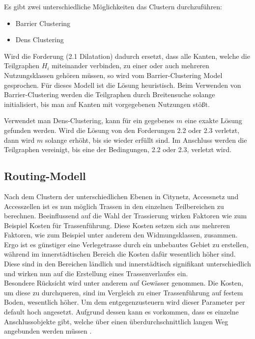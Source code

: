Es gibt zwei unterschiedliche Möglichkeiten das Clustern durchzuführen:


\begin{itemize}
\item Barrier Clustering
\item Dens Clustering
\end{itemize}


\par Wird die Forderung (2.1 Dilatation) dadurch ersetzt, dass alle Kanten, welche die Teilgraphen $H_{i}$
miteinander verbinden, zu einer oder auch mehreren Nutzungsklassen gehören müssen, so wird vom Barrier-Clustering Model gesprochen.
Für dieses Modell ist die Lösung heuristisch. Beim Verwenden von Barrier-Clustering werden die Teilgraphen durch
Breitensuche solange initialisiert, bis man auf Kanten mit vorgegebenen Nutzungen stößt.

\vspace{0.5cm}
\par  Verwendet man Dens-Clustering, kann für ein gegebenes $m$ eine exakte Lösung gefunden werden.  
Wird die Lösung von den Forderungen 2.2 oder 2.3 verletzt,  dann wird $m$ solange erhöht, bis sie wieder erfüllt sind.
Im Anschluss werden die Teilgraphen vereinigt, bis eine der Bedingungen, 2.2 oder 2.3, verletzt wird.


\vspace{1cm}


\subsection{Routing-Modell}
\label{sec:2 modelle}


\vspace{0.5cm}

\par Nach dem Clustern der unterschiedlichen Ebenen in Citynetz, Accessnetz  und Accesszellen ist es nun möglich Trassen in den einzelnen Teilbereichen zu
berechnen. Beeinflussend auf die Wahl der Trassierung wirken Faktoren wie zum Beispiel Kosten für Trassenführung. Diese Kosten setzen sich aus mehreren
Faktoren, wie zum Beispiel unter anderem den Widmungsklassen, zusammen. 
\\
Ergo ist es günstiger eine Verlegetrasse durch ein unbebautes Gebiet zu erstellen, während im
innerstädtischen Bereich die Kosten dafür wesentlich höher sind.
Diese sind in den Bereichen ländlich und innerstädtisch signifikant unterschiedlich und wirken nun auf die Erstellung eines Trassenverlaufes ein.\\ Besondere
Rücksicht wird unter anderem auf Gewässer genommen. 
Die Kosten, um diese zu durchqueren, sind im Vergleich zu einer Trassenführung auf festem Boden,
wesentlich höher.
Um dem entgegenzusteuern wird dieser Parameter per default hoch angesetzt. 
Aufgrund dessen kann es vorkommen, dass es einzelne Anschlussobjekte gibt, welche über einen überdurchschnittlich langen Weg angebunden werden müssen
\cite{tech_rep_1}.

